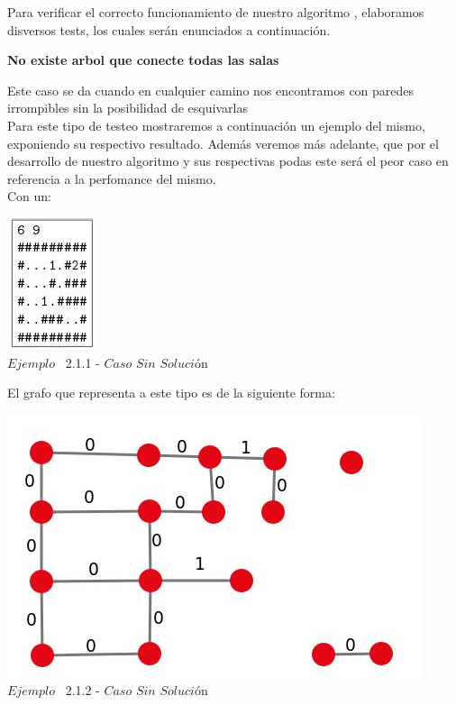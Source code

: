\indent Para verificar el correcto funcionamiento de nuestro algoritmo , elaboramos disversos tests,
los cuales ser\'an enunciados a continuaci\'on.\\

\begin{center}
 \textbf{No existe arbol que conecte todas las salas}
\end{center}

Este caso se da cuando en cualquier camino nos encontramos con paredes irrompibles sin la posibilidad de esquivarlas\\

 Para este tipo de testeo mostraremos a continuaci\'on un ejemplo del mismo, exponiendo su respectivo resultado. Adem\'as veremos m\'as adelante, que por el desarrollo de nuestro algoritmo y sus respectivas podas este ser\'a el peor caso en referencia a la perfomance del mismo.\\
 
 Con un:
 
\vspace*{0.3cm} \vspace*{0.3cm}
  \begin{center}
 \includegraphics[scale=0.65]{./EJ2/ej2sinsolucion.jpeg}
\\{$Ejemplo$ \ 2.1.1 - $Caso$ $Sin$ $Soluci$\'on}
  \end{center}
  \vspace*{0.3cm}

El grafo que representa a este tipo es de la siguiente forma:\\

\vspace*{0.3cm} \vspace*{0.3cm}
  \begin{center}
 \includegraphics[scale=0.5]{./EJ2/ej2grafosinsolucion.jpeg}
 \\{$Ejemplo$ \ 2.1.2 - $Caso$ $Sin$ $Soluci$\'on}
  \end{center}
  \vspace*{0.3cm}


